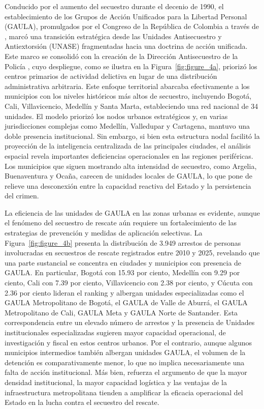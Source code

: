 \documentclass[12pt]{article}
\providecommand{\textcite}{\citet}
\theoremstyle{definition}
\theoremstyle{remark}
\newcommand{\1}{\mathbf{1}}
\begin{document}
Conducido por el aumento del secuestro durante el decenio de 1990, el establecimiento de los Grupos de Acción Unificados para la Libertad Personal (GAULA), promulgados por el Congreso de la República de Colombia a través de \textcite{ley282_1996}, marcó una transición estratégica desde las Unidades Antisecuestro y Antiextorsión (UNASE) fragmentadas hacia una doctrina de acción unificada. Este marco se consolidó con la creación de la Dirección Antisecuestro de la Policía \textcite{decreto864_1998}, cuyo despliegue, como se ilustra en la Figura~\ref{fig:figure_4a}, priorizó los centros primarios de actividad delictiva en lugar de una distribución administrativa arbitraria. Este enfoque territorial abarcaba efectivamente a los municipios con los niveles históricos más altos de secuestro, incluyendo Bogotá, Cali, Villavicencio, Medellín y Santa Marta, estableciendo una red nacional de 34 unidades. El modelo priorizó los nodos urbanos estratégicos y, en varias jurisdicciones complejas como Medellín, Valledupar y Cartagena, mantuvo una doble presencia institucional. Sin embargo, si bien esta estructura nodal facilitó la proyección de la inteligencia centralizada de las principales ciudades, el análisis espacial revela importantes deficiencias operacionales en las regiones periféricas. Los municipios que siguen mostrando alta intensidad de secuestro, como Argelia, Buenaventura y Ocaña, carecen de unidades locales de GAULA, lo que pone de relieve una desconexión entre la capacidad reactiva del Estado y la persistencia del crimen.

La eficiencia de las unidades de GAULA en las zonas urbanas es evidente, aunque el fenómeno del secuestro de rescate aún requiere un fortalecimiento de las estrategias de prevención y medidas de aplicación selectivas. La Figura~\ref{fig:figure_4b} presenta la distribución de 3.949 arrestos de personas involucradas en secuestros de rescate registrados entre 2010 y 2025, revelando que una parte sustancial se concentra en ciudades y municipios con presencia de GAULA. En particular, Bogotá con 15.93 por ciento, Medellín con 9.29 por ciento, Cali con 7.39 por ciento, Villavicencio con 2.38 por ciento, y Cúcuta con 2.36 por ciento lideran el ranking y albergan unidades especializadas como el GAULA Metropolitano de Bogotá, el GAULA de Valle de Aburrá, el GAULA Metropolitano de Cali, GAULA Meta y GAULA Norte de Santander. Esta correspondencia entre un elevado número de arrestos y la presencia de Unidades institucionales especializadas sugieren mayor capacidad operacional, de investigación y fiscal en estos centros urbanos. Por el contrario, aunque algunos municipios intermedios también albergan unidades GAULA, el volumen de la detención es comparativamente menor, lo que no implica necesariamente una falta de acción institucional. Más bien, refuerza el argumento de que la mayor densidad institucional, la mayor capacidad logística y las ventajas de la infraestructura metropolitana tienden a amplificar la eficacia operacional del Estado en la lucha contra el secuestro del rescate.
\end{document}
